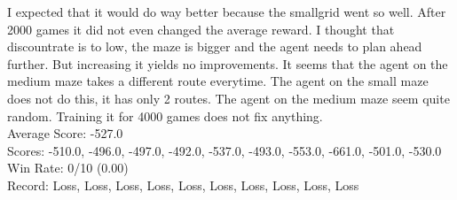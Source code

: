 I expected that it would do way better because the smallgrid went
so well. After 2000 games it did not even changed the average reward.
I thought that discountrate is to low, the maze is bigger and the agent needs
to plan ahead further. But increasing it yields no improvements.
It seems that the agent on the medium maze takes a different route
everytime. The agent on the small maze does not do this, it has only 
2 routes. The agent on the medium maze seem quite random. 
Training it for 4000 games does not fix anything.\\
Average Score: -527.0\\
Scores:        -510.0, -496.0, -497.0, -492.0, -537.0, -493.0, -553.0, -661.0, -501.0, -530.0\\
Win Rate:      0/10 (0.00)\\
Record:        Loss, Loss, Loss, Loss, Loss, Loss, Loss, Loss, Loss, Loss\\